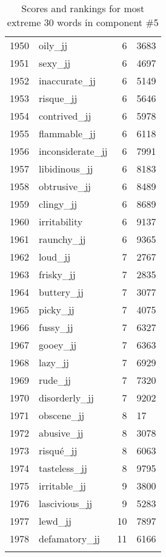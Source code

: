 \begin{longtable}[!htbp]{| rlr@{.}l |}
    1950 & oily\_jj & 6 & 3683 \\
    1951 & sexy\_jj & 6 & 4697 \\
    1952 & inaccurate\_jj & 6 & 5149 \\
    1953 & risque\_jj & 6 & 5646 \\
    1954 & contrived\_jj & 6 & 5978 \\
    1955 & flammable\_jj & 6 & 6118 \\
    1956 & inconsiderate\_jj & 6 & 7991 \\
    1957 & libidinous\_jj & 6 & 8183 \\
    1958 & obtrusive\_jj & 6 & 8489 \\
    1959 & clingy\_jj & 6 & 8689 \\
    1960 & irritability & 6 & 9137 \\
    1961 & raunchy\_jj & 6 & 9365 \\
    1962 & loud\_jj & 7 & 2767 \\
    1963 & frisky\_jj & 7 & 2835 \\
    1964 & buttery\_jj & 7 & 3077 \\
    1965 & picky\_jj & 7 & 4075 \\
    1966 & fussy\_jj & 7 & 6327 \\
    1967 & gooey\_jj & 7 & 6363 \\
    1968 & lazy\_jj & 7 & 6929 \\
    1969 & rude\_jj & 7 & 7320 \\
    1970 & disorderly\_jj & 7 & 9202 \\
    1971 & obscene\_jj & 8 & 17 \\
    1972 & abusive\_jj & 8 & 3078 \\
    1973 & risqué\_jj & 8 & 6063 \\
    1974 & tasteless\_jj & 8 & 9795 \\
    1975 & irritable\_jj & 9 & 3800 \\
    1976 & lascivious\_jj & 9 & 5283 \\
    1977 & lewd\_jj & 10 & 7897 \\
    1978 & defamatory\_jj & 11 & 6166 \\
    \hline
    \caption{Scores and rankings for most extreme 30 words in component \#5} \\
\end{longtable}
